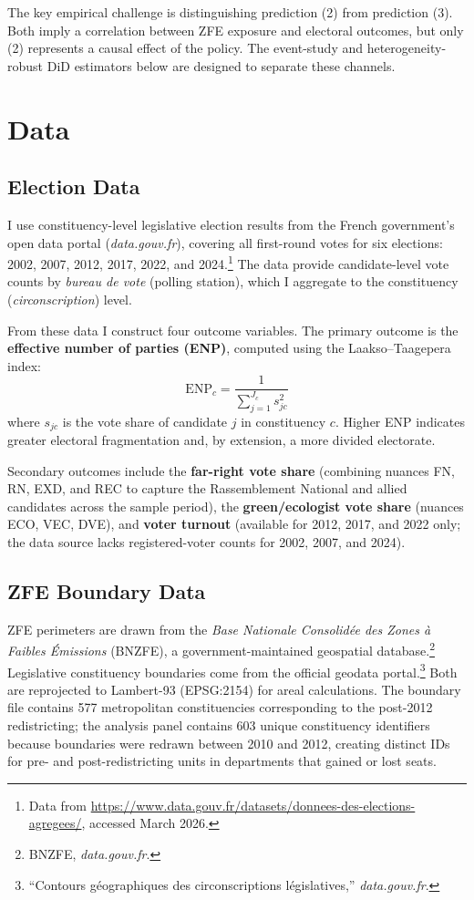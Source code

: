\documentclass[12pt]{article}
\begin{document}
The key empirical challenge is distinguishing prediction (2) from prediction (3). Both imply a correlation between ZFE exposure and electoral outcomes, but only (2) represents a causal effect of the policy. The event-study and heterogeneity-robust DiD estimators below are designed to separate these channels.


\section{Data}

\subsection{Election Data}

I use constituency-level legislative election results from the French government's open data portal (\textit{data.gouv.fr}), covering all first-round votes for six elections: 2002, 2007, 2012, 2017, 2022, and 2024.\footnote{Data from \url{https://www.data.gouv.fr/datasets/donnees-des-elections-agregees/}, accessed March 2026.} The data provide candidate-level vote counts by \textit{bureau de vote} (polling station), which I aggregate to the constituency (\textit{circonscription}) level.

From these data I construct four outcome variables. The primary outcome is the \textbf{effective number of parties (ENP)}, computed using the Laakso--Taagepera index:
\begin{equation}
\text{ENP}_c = \frac{1}{\sum_{j=1}^{J_c} s_{jc}^2}
\label{eq:enp}
\end{equation}
where $s_{jc}$ is the vote share of candidate $j$ in constituency $c$. Higher ENP indicates greater electoral fragmentation and, by extension, a more divided electorate.

Secondary outcomes include the \textbf{far-right vote share} (combining nuances FN, RN, EXD, and REC to capture the Rassemblement National and allied candidates across the sample period), the \textbf{green/ecologist vote share} (nuances ECO, VEC, DVE), and \textbf{voter turnout} (available for 2012, 2017, and 2022 only; the data source lacks registered-voter counts for 2002, 2007, and 2024).

\subsection{ZFE Boundary Data}

ZFE perimeters are drawn from the \textit{Base Nationale Consolid\'ee des Zones \`a Faibles \'Emissions} (BNZFE), a government-maintained geospatial database.\footnote{BNZFE, \textit{data.gouv.fr}.} Legislative constituency boundaries come from the official geodata portal.\footnote{``Contours g\'eographiques des circonscriptions l\'egislatives,'' \textit{data.gouv.fr}.} Both are reprojected to Lambert-93 (EPSG:2154) for areal calculations. The boundary file contains 577 metropolitan constituencies corresponding to the post-2012 redistricting; the analysis panel contains 603 unique constituency identifiers because boundaries were redrawn between 2010 and 2012, creating distinct IDs for pre- and post-redistricting units in departments that gained or lost seats.
\end{document}
